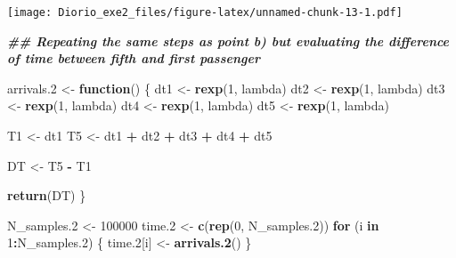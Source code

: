\documentclass[
]{article}
\newenvironment{Shaded}{\begin{snugshade}}{\end{snugshade}}
\newcommand{\ControlFlowTok}[1]{\textcolor[rgb]{0.13,0.29,0.53}{\textbf{#1}}}
\newcommand{\DecValTok}[1]{\textcolor[rgb]{0.00,0.00,0.81}{#1}}
\newcommand{\DocumentationTok}[1]{\textcolor[rgb]{0.56,0.35,0.01}{\textbf{\textit{#1}}}}
\newcommand{\FloatTok}[1]{\textcolor[rgb]{0.00,0.00,0.81}{#1}}
\newcommand{\FunctionTok}[1]{\textcolor[rgb]{0.13,0.29,0.53}{\textbf{#1}}}
\newcommand{\NormalTok}[1]{#1}
\newcommand{\OtherTok}[1]{\textcolor[rgb]{0.56,0.35,0.01}{#1}}
\newcommand{\SpecialCharTok}[1]{\textcolor[rgb]{0.81,0.36,0.00}{\textbf{#1}}}
\begin{document}
\texttt{[image: Diorio\_exe2\_files/figure-latex/unnamed-chunk-13-1.pdf]}

\begin{Shaded}
\begin{Highlighting}[]
\DocumentationTok{\#\# Repeating the same steps as point b) but evaluating the difference of time between fifth and first passenger}

\NormalTok{arrivals}\FloatTok{.2} \OtherTok{\textless{}{-}} \ControlFlowTok{function}\NormalTok{() \{}
\NormalTok{  dt1 }\OtherTok{\textless{}{-}} \FunctionTok{rexp}\NormalTok{(}\DecValTok{1}\NormalTok{, lambda)}
\NormalTok{  dt2 }\OtherTok{\textless{}{-}} \FunctionTok{rexp}\NormalTok{(}\DecValTok{1}\NormalTok{, lambda)}
\NormalTok{  dt3 }\OtherTok{\textless{}{-}} \FunctionTok{rexp}\NormalTok{(}\DecValTok{1}\NormalTok{, lambda)}
\NormalTok{  dt4 }\OtherTok{\textless{}{-}} \FunctionTok{rexp}\NormalTok{(}\DecValTok{1}\NormalTok{, lambda)}
\NormalTok{  dt5 }\OtherTok{\textless{}{-}} \FunctionTok{rexp}\NormalTok{(}\DecValTok{1}\NormalTok{, lambda)}
  
\NormalTok{  T1 }\OtherTok{\textless{}{-}}\NormalTok{ dt1 }
\NormalTok{  T5 }\OtherTok{\textless{}{-}}\NormalTok{ dt1 }\SpecialCharTok{+}\NormalTok{ dt2 }\SpecialCharTok{+}\NormalTok{ dt3 }\SpecialCharTok{+}\NormalTok{ dt4 }\SpecialCharTok{+}\NormalTok{ dt5}
  
\NormalTok{  DT }\OtherTok{\textless{}{-}}\NormalTok{ T5 }\SpecialCharTok{{-}}\NormalTok{ T1}
  
  \FunctionTok{return}\NormalTok{(DT)}
\NormalTok{\}}

\NormalTok{N\_samples}\FloatTok{.2} \OtherTok{\textless{}{-}} \DecValTok{100000}
\NormalTok{time}\FloatTok{.2} \OtherTok{\textless{}{-}} \FunctionTok{c}\NormalTok{(}\FunctionTok{rep}\NormalTok{(}\DecValTok{0}\NormalTok{, N\_samples}\FloatTok{.2}\NormalTok{))}
\ControlFlowTok{for}\NormalTok{ (i }\ControlFlowTok{in} \DecValTok{1}\SpecialCharTok{:}\NormalTok{N\_samples}\FloatTok{.2}\NormalTok{) \{}
\NormalTok{  time}\FloatTok{.2}\NormalTok{[i] }\OtherTok{\textless{}{-}} \FunctionTok{arrivals.2}\NormalTok{()}
\NormalTok{\}}


\end{Highlighting}
\end{Shaded}
\end{document}
